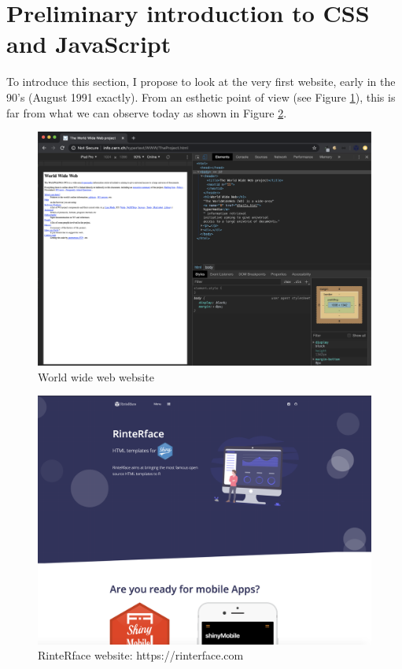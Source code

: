\documentclass[]{book}
\begin{document}
\hypertarget{preliminary-introduction-to-css-and-javascript}{%
\section{Preliminary introduction to CSS and JavaScript}\label{preliminary-introduction-to-css-and-javascript}}

To introduce this section, I propose to look at the very first website, early in the 90's (August 1991 exactly). From an esthetic point of view (see Figure \ref{fig:www-first}), this is far from what we can observe today as shown in Figure \ref{fig:www-rinterface}.

\begin{figure}
\includegraphics[width=33in]{images/survival-kit/www-first} \caption{World wide web website}\label{fig:www-first}
\end{figure}

\begin{figure}
\includegraphics[width=32.78in]{images/survival-kit/www-rinterface} \caption{RinteRface website: https://rinterface.com}\label{fig:www-rinterface}
\end{figure}
\end{document}
